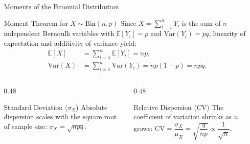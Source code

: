 \documentclass[aspectratio=169,xcolor={dvipsnames,table}]{beamer}
\begin{document}
\begin{frame}{Moments of the Binomial Distribution}
	\begin{block}{Moment Theorem for $X \sim \text{Bin}(n, p)$}
		\small
		Since $X = \sum_{i=1}^n Y_i$ is the sum of $n$ independent Bernoulli variables with $\mathbb{E}[Y_i]=p$ and $\text{Var}(Y_i)=pq$, linearity of expectation and additivity of variance yield:
		\begin{align*}
			\mathbb{E}[X] &= \sum_{i=1}^n \mathbb{E}[Y_i] = np, \\
			\text{Var}(X) &= \sum_{i=1}^n \text{Var}(Y_i) = np(1-p) = npq.
		\end{align*}
	\end{block}
	\vspace{-0.15cm}
	\begin{columns}[T]
		\begin{column}{0.48\textwidth}
			\begin{exampleblock}{Standard Deviation ($\sigma_X$)}
				\footnotesize
				Absolute dispersion scales with the square root of sample size: $\sigma_X = \sqrt{npq}$.
			\end{exampleblock}
		\end{column}
		\begin{column}{0.48\textwidth}
			\begin{alertblock}{Relative Dispersion (CV)}
				\footnotesize
				The coefficient of variation shrinks as $n$ grows: $\text{CV} = \dfrac{\sigma_X}{\mu_X} = \sqrt{\dfrac{q}{np}} \propto \dfrac{1}{\sqrt{n}}$.
			\end{alertblock}
		\end{column}
	\end{columns}
\end{frame}
\end{document}
